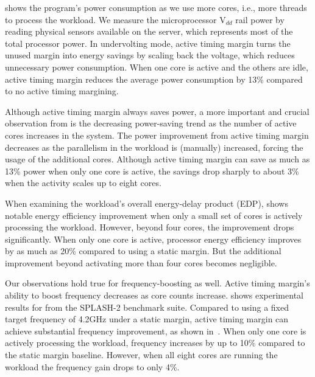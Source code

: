  shows the program's power consumption as we use more cores, i.e., more threads to process the workload. We measure the microprocessor V$_{dd}$ rail power by reading physical sensors available on the server, which represents most of the total processor power. In undervolting mode, active timing margin turns the unused margin into energy savings by scaling back the voltage, which reduces unnecessary power consumption. When one core is active and the others are idle, active timing margin reduces the average power consumption by 13\% compared to no active timing margining. 

Although active timing margin always saves power, a more important and crucial observation from  is the decreasing power-saving trend as the number of active cores increases in the system. The power improvement from active timing margin decreases as the parallelism in the workload is (manually) increased, forcing the usage of the additional cores. Although active timing margin can save as much as 13\% power when only one core is active, the savings drop sharply to about 3\% when the activity scales up to eight cores.

When examining the workload's overall energy-delay product (EDP),  shows notable energy efficiency improvement when only a small set of cores is actively processing the workload. However, beyond four cores, the improvement drops significantly. When only one core is active, processor energy efficiency improves by as much as 20\% compared to using a static margin. But the additional improvement beyond activating more than four cores becomes negligible. 

Our observations hold true for frequency-boosting as well. Active timing margin's ability to boost frequency decreases as core counts increase.  shows experimental results for  from the SPLASH-2 benchmark suite. Compared to using a fixed target frequency of 4.2GHz under a static margin, active timing margin can achieve substantial frequency improvement, as shown in~. When only one core is actively processing the workload, frequency increases by up to 10\% compared to the static margin baseline. However, when all eight cores are running the workload the frequency gain drops to only 4\%.

